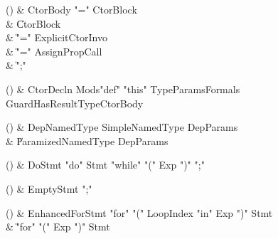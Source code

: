 \begin{bbgrammarappendix}{4.2in}

() & CtorBody \label{prod:CtorBody}  \: \xcd"=" CtorBlock  \\

 &    \| CtorBlock \\
 &    \| \xcd"=" ExplicitCtorInvo \\
 &    \| \xcd"=" AssignPropCall \\
 &    \| \xcd";" \\

\end{bbgrammarappendix}

\begin{bbgrammarappendix}{4.1in}

() & CtorDecln \label{prod:CtorDecln}  \: Mods\opt \xcd"def" \xcd"this" TypeParams\opt Formals Guard\opt HasResultType\opt CtorBody  \\


\end{bbgrammarappendix}

\begin{bbgrammarappendix}{3.8in}

() & DepNamedType \label{prod:DepNamedType}  \: SimpleNamedType DepParams  \\

 &    \| ParamizedNamedType DepParams \\

\end{bbgrammarappendix}

\begin{bbgrammarappendix}{4.4in}

() & DoStmt \label{prod:DoStmt}  \: \xcd"do" Stmt \xcd"while" \xcd"(" Exp \xcd")" \xcd";"  \\


\end{bbgrammarappendix}

\begin{bbgrammarappendix}{4.1in}

() & EmptyStmt \label{prod:EmptyStmt}  \: \xcd";"  \\


\end{bbgrammarappendix}

\begin{bbgrammarappendix}{3.5in}

() & EnhancedForStmt \label{prod:EnhancedForStmt}  \: \xcd"for" \xcd"(" LoopIndex \xcd"in" Exp \xcd")" Stmt  \\

 &    \| \xcd"for" \xcd"(" Exp \xcd")" Stmt \\

\end{bbgrammarappendix}

